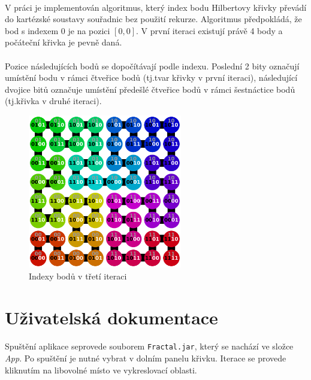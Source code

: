 \documentclass[12pt]{scrartcl}
\begin{document}
\paragraph{}
V práci je implementován algoritmus, který index bodu Hilbertovy křivky převádí do kartézské soustavy souřadnic bez použití rekurze. Algoritmus předpokládá, že bod s indexem $0$ je na pozici $[0,0]$. V první iteraci existují právě 4 body a počáteční křivka je pevně daná.

\paragraph{}
Pozice následujících bodů se dopočítávají podle indexu. Poslední 2 bity označují umístění bodu v rámci čtveřice bodů (tj.\nobreakspace tvar křivky v první iteraci), následující dvojice bitů označuje umístění předešlé čtveřice bodů v rámci šestnáctice bodů (tj.\nobreakspace křivka v druhé iteraci).

\begin{figure}[!ht]
	\centering
	\includegraphics[width=0.6\textwidth,natwidth=1,natheight=1]{hilbert.pdf}
	\caption{Indexy bodů v třetí iteraci}
\end{figure}

\newpage
\section{Uživatelská dokumentace}

\paragraph{}
Spuštění aplikace se\nobreakspace provede souborem \texttt{Fractal.jar}, který se nachází ve složce \emph{App}. Po spuštění je nutné vybrat v dolním panelu křivku. Iterace se provede kliknutím na libovolné místo ve vykreslovací oblasti.
\end{document}
